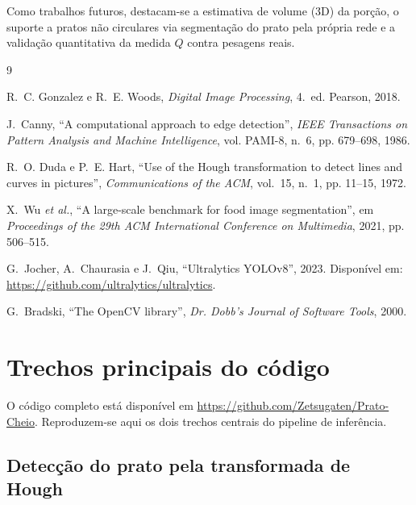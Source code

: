 \documentclass[12pt,a4paper]{article}
\begin{document}
Como trabalhos futuros, destacam-se a estimativa de volume (3D) da porção, o suporte a pratos
não circulares via segmentação do prato pela própria rede e a validação quantitativa da medida
$Q$ contra pesagens reais.

\begin{thebibliography}{9}

R.~C. Gonzalez e R.~E. Woods, \emph{Digital Image Processing}, 4.~ed. Pearson, 2018.

J.~Canny, ``A computational approach to edge detection'', \emph{IEEE Transactions on Pattern
Analysis and Machine Intelligence}, vol. PAMI-8, n.~6, pp. 679--698, 1986.

R.~O. Duda e P.~E. Hart, ``Use of the Hough transformation to detect lines and curves in
pictures'', \emph{Communications of the ACM}, vol.~15, n.~1, pp. 11--15, 1972.

X.~Wu \emph{et al.}, ``A large-scale benchmark for food image segmentation'', em
\emph{Proceedings of the 29th ACM International Conference on Multimedia}, 2021, pp. 506--515.

G.~Jocher, A.~Chaurasia e J.~Qiu, ``Ultralytics YOLOv8'', 2023. Disponível em:
\url{https://github.com/ultralytics/ultralytics}.

G.~Bradski, ``The OpenCV library'', \emph{Dr. Dobb's Journal of Software Tools}, 2000.

\end{thebibliography}

\appendix

\section{Trechos principais do código}

O código completo está disponível em
\url{https://github.com/Zetsugaten/Prato-Cheio}. Reproduzem-se aqui os dois trechos
centrais do pipeline de inferência.

\subsection{Detecção do prato pela transformada de Hough}
\end{document}
